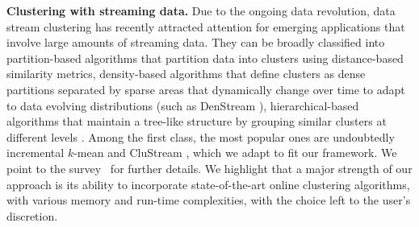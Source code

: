 \documentclass[12pt]{article}
\renewcommand{\paragraph}[1]{\textbf{#1.}\;}
\newcommand{\bnote}[1]{\textcolor{purple}{\textbf{[B: #1]}}}
\newcommand{\MartaNote}[1]{\textcolor{green}{\textbf{[M: #1]}}}
\begin{document}


\paragraph{Clustering with streaming data}
Due to the ongoing data revolution, data stream clustering has recently attracted attention for emerging applications that involve large amounts of streaming data.
They can be broadly classified into partition-based algorithms that partition data into clusters using distance-based similarity metrics, density-based algorithms that define clusters as dense partitions separated by sparse areas that dynamically change over time to adapt to data evolving distributions (such as DenStream \cite{cao2006density}), hierarchical-based algorithms that maintain a tree-like structure by grouping similar clusters at different levels \cite{murtagh2012algorithms}. Among the first class, the most popular ones are undoubtedly incremental $k$-mean \cite{aaron2014dynamic} and CluStream \cite{clustream}, which we adapt to fit our framework. 
We point to the survey~\cite{streaming} for further details. 
We highlight that a major strength of our approach is its ability to incorporate state-of-the-art online clustering algorithms, with various memory and run-time complexities, with the choice left to the user's discretion. 
\ifpreprint
\end{document}
